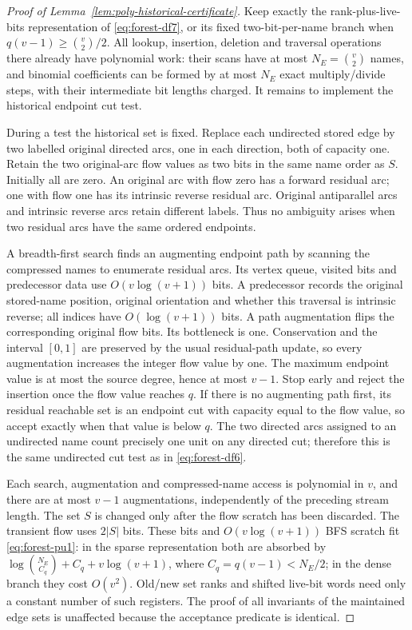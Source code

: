 \documentclass[11pt,letterpaper]{article}
\numberwithin{equation}{section}
\begin{document}
\begin{proof}[Proof of Lemma~\ref{lem:poly-historical-certificate}]
Keep exactly the rank-plus-live-bits representation of \eqref{eq:forest-df7}, or its fixed two-bit-per-name branch when $q(v-1)\ge\binom{v}{2}/2$.
All lookup, insertion, deletion and traversal operations there already have polynomial work: their scans have at most $N_E=\binom{v}{2}$ names, and binomial coefficients can be formed by at most $N_E$ exact multiply/divide steps, with their intermediate bit lengths charged.
It remains to implement the historical endpoint cut test.

During a test the historical set is fixed.
Replace each undirected stored edge by two labelled original directed arcs, one in each direction, both of capacity one.
Retain the two original-arc flow values as two bits in the same name order as $S$.
Initially all are zero.
An original arc with flow zero has a forward residual arc; one with flow one has its intrinsic reverse residual arc.
Original antiparallel arcs and intrinsic reverse arcs retain different labels.
Thus no ambiguity arises when two residual arcs have the same ordered endpoints.

A breadth-first search finds an augmenting endpoint path by scanning the compressed names to enumerate residual arcs.
Its vertex queue, visited bits and predecessor data use $O(v\log(v+1))$ bits.
A predecessor records the original stored-name position, original orientation and whether this traversal is intrinsic reverse; all indices have $O(\log(v+1))$ bits.
A path augmentation flips the corresponding original flow bits.
Its bottleneck is one.
Conservation and the interval $[0,1]$ are preserved by the usual residual-path update, so every augmentation increases the integer flow value by one.
The maximum endpoint value is at most the source degree, hence at most $v-1$.
Stop early and reject the insertion once the flow value reaches $q$.
If there is no augmenting path first, its residual reachable set is an endpoint cut with capacity equal to the flow value, so accept exactly when that value is below $q$.
The two directed arcs assigned to an undirected name count precisely one unit on any directed cut; therefore this is the same undirected cut test as in \eqref{eq:forest-df6}.

Each search, augmentation and compressed-name access is polynomial in $v$, and there are at most $v-1$ augmentations, independently of the preceding stream length.
The set $S$ is changed only after the flow scratch has been discarded.
The transient flow uses $2|S|$ bits.
These bits and $O(v\log(v+1))$ BFS scratch fit \eqref{eq:forest-pu1}: in the sparse representation both are absorbed by $\log\binom{N_E}{C_q}+C_q+v\log(v+1)$, where $C_q=q(v-1)<N_E/2$; in the dense branch they cost $O(v^2)$.
Old/new set ranks and shifted live-bit words need only a constant number of such registers.
The proof of all invariants of the maintained edge sets is unaffected because the acceptance predicate is identical.
\end{proof}
\end{document}
